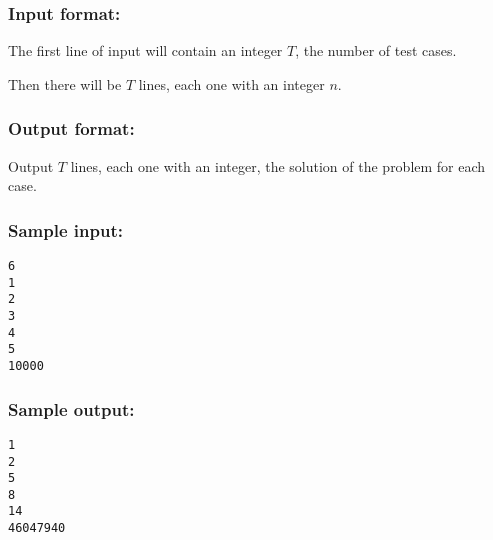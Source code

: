 \hypertarget{input-format}{%
\subsubsection{Input format:}\label{input-format}}

The first line of input will contain an integer \(T\), the number of
test cases.

Then there will be \(T\) lines, each one with an integer \(n\).

\hypertarget{output-format}{%
\subsubsection{Output format:}\label{output-format}}

Output \(T\) lines, each one with an integer, the solution of the
problem for each case.

\hypertarget{sample-input}{%
\subsubsection{Sample input:}\label{sample-input}}

\begin{verbatim}
6
1
2
3
4
5
10000
\end{verbatim}

\hypertarget{sample-output}{%
\subsubsection{Sample output:}\label{sample-output}}

\begin{verbatim}
1
2
5
8
14
46047940
\end{verbatim}
